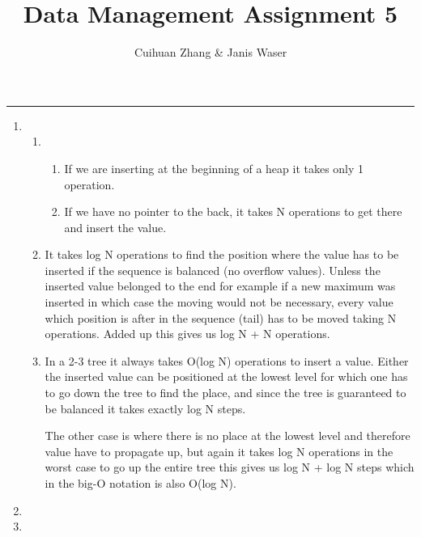 \documentclass[12pt]{extarticle}
\title{Data Management Assignment 5}
\author{Cuihuan Zhang \& Janis Waser}
\begin{document}
\maketitle \vspace{-10mm}
\rule{\linewidth}{0.4pt}


\begin{flushleft}
\begin{enumerate}[label=\textbf{\Alph*.}]

\item 
\begin{enumerate}[label=\arabic*)]
\item \begin{enumerate}[label=(\alph*)]
\item If we are inserting at the beginning of a heap it takes only 1 operation. 
\item If we have no pointer to the back, it takes N operations to get there and insert the value.
\end{enumerate}
\item It takes log N operations to find the position where the value has to be inserted if the sequence is balanced (no overflow values). Unless the inserted value belonged to the end for example if a new maximum was inserted in which case the moving would not be necessary, every value which position is after in the sequence (tail) has to be moved taking N operations.  Added up this gives us log N + N operations. 
\item In a 2-3 tree it always takes O(log N) operations to insert a value. Either the inserted value can be positioned at the lowest level for which one has to go down the tree to find the place, and since the tree is guaranteed to be balanced it takes exactly log N steps.

The other case is where there is no place at the lowest level and therefore value have to propagate up, but again it takes log N operations in the worst case to go up the entire tree this gives us log N + log N steps which in the big-O notation is also O(log N).
\end{enumerate}
\item
\item

\end{enumerate}
\end{flushleft}
\end{document}
